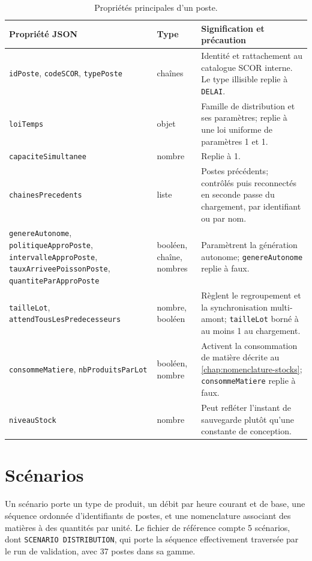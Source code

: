 \begin{table}[H]
  \centering
  \small
  \begin{tabularx}{\textwidth}{L{0.24\textwidth} L{0.10\textwidth} Y}
    \toprule
    Propriété JSON & Type & Signification et précaution \\
    \midrule
    \texttt{idPoste}, \texttt{codeSCOR}, \texttt{typePoste} & chaînes & Identité et rattachement au catalogue SCOR interne. Le type illisible replie à \texttt{DELAI}. \\
    \texttt{loiTemps} & objet & Famille de distribution et ses paramètres; replie à une loi uniforme de paramètres 1 et 1. \\
    \texttt{capaciteSimultanee} & nombre & Replie à 1. \\
    \texttt{chainesPrecedents} & liste & Postes précédents; contrôlés puis reconnectés en seconde passe du chargement, par identifiant ou par nom. \\
    \texttt{genereAutonome}, \texttt{politiqueApproPoste}, \texttt{intervalleApproPoste}, \texttt{tauxArriveePoissonPoste}, \texttt{quantiteParApproPoste} & booléen, chaîne, nombres & Paramètrent la génération autonome; \texttt{genereAutonome} replie à faux. \\
    \texttt{tailleLot}, \texttt{attend\allowbreak Tous\allowbreak Les\allowbreak Predecesseurs} & nombre, booléen & Règlent le regroupement et la synchronisation multi-amont; \texttt{tailleLot} borné à au moins 1 au chargement. \\
    \texttt{consommeMatiere}, \texttt{nbProduitsParLot} & booléen, nombre & Activent la consommation de matière décrite au \cref{chap:nomenclature-stocks}; \texttt{consommeMatiere} replie à faux. \\
    \texttt{niveauStock} & nombre & Peut refléter l'instant de sauvegarde plutôt qu'une constante de conception. \\
    \bottomrule
  \end{tabularx}
  \caption{Propriétés principales d'un poste.}
  \label{tab:json-postes}
\end{table}

\section{Scénarios}

Un scénario porte un type de produit, un débit par heure courant et de base, une séquence ordonnée d'identifiants de postes, et une nomenclature associant des matières à des quantités par unité. Le fichier de référence compte 5 scénarios, dont \texttt{SCENARIO DISTRIBUTION}, qui porte la séquence effectivement traversée par le run de validation, avec 37 postes dans sa gamme.

